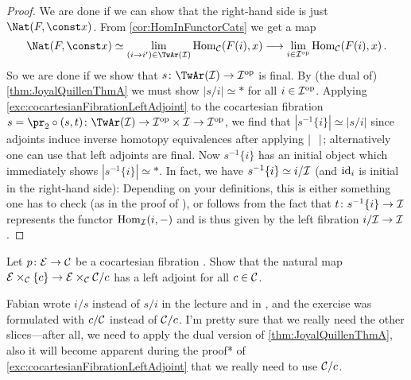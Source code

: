 \begin{proof}
	We are done if we can show that the right-hand side is just $\Nat(F,\const x)$. From \cref{cor:HomInFunctorCats} we get a map
	\begin{equation*}
		\Nat(F,\const x)\simeq \limit_{(i\rightarrow i')\in\TwAr(\Ii)}\Hom_\Cc(F(i),x)\morphism\limit_{i\in\Ii^\op}\Hom_\Cc(F(i),x)\,.
	\end{equation*}
	So we are done if we show that $s\colon\TwAr(\Ii)\morphism\Ii^\op$ is final. By (the dual of) \cref{thm:JoyalQuillenThmA} we must show $|s/i|\simeq *$ for all $i\in \mathcal{I}^{\mathrm{op}}$. Applying \cref{exc:cocartesianFibrationLeftAdjoint} to the cocartesian fibration $s={\pr_2}\circ(s,t)\colon\TwAr(\Ii)\morphism\Ii^\op\times\Ii\morphism\Ii^\op$, we find that $|s^{-1}\{i\}|\simeq|s/i|$ since adjoints induce inverse homotopy equivalences after applying $|\blank|$; alternatively one can use that left adjoints are final. Now $s^{-1}\{i\}$ has an initial object which immediately shows $|s^{-1}\{i\}|\simeq *$. In fact, we have $s^{-1}\{i\}\simeq i/\mathcal{I}$ (and $\operatorname{id}_i$ is initial in the right-hand side): Depending on your definitions, this is either something one has to check (as in the proof of \cite[Proposition~]{HA}), or follows from the fact that $t\colon s^{-1}\{i\}\morphism \Ii$ represents the functor $\operatorname{Hom}_{\mathcal{I}}(i,-)$ and is thus given by the left fibration $i/\Ii\morphism \Ii$.
\end{proof}
\begin{exc}\label{exc:cocartesianFibrationLeftAdjoint}
	Let $p\colon \Ee\morphism\Cc$ be a cocartesian fibration . Show that the natural map $\Ee\times_\Cc\{c\}\morphism \Ee\times_\Cc \Cc/c$ has a left adjoint for all $c\in \mathcal{C}$.
\end{exc}
Fabian wrote $i/s$ instead of $s/i$ in the lecture and in \cite[Corollar~I.50]{KTheory}, and the exercise was formulated with $c/\mathcal{C}$ instead of $\mathcal{C}/c$. I'm pretty sure that we really need the other slices---after all, we need to apply the dual version of \cref{thm:JoyalQuillenThmA}, also it will become apparent during the proof* of \cref{exc:cocartesianFibrationLeftAdjoint} that we really need to use $\mathcal{C}/c$.
